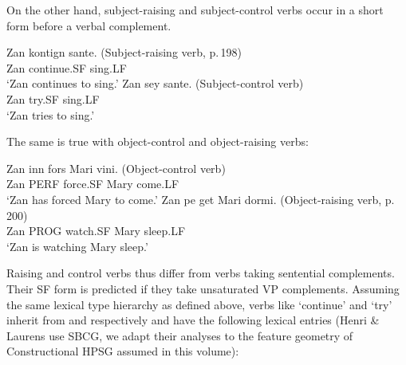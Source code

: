 \documentclass[output=paper]{langsci/langscibook}
\begin{document}
On the other hand, subject-raising and subject-control verbs occur in a short form before a verbal complement.

\begin{exe}
\ex \begin{xlist}
\ex \gll Zan kontign sante. (Subject-raising verb, p.\,198)\\
Zan continue.SF sing.LF\\
\glt `Zan continues to sing.'
\ex \gll Zan sey sante. (Subject-control verb)\\
Zan try.SF sing.LF\\
\glt `Zan tries to sing.'
\end{xlist}
\end{exe}

The same is true with object-control and object-raising verbs:
\begin{exe}
\ex \begin{xlist}
\ex \gll Zan inn fors Mari vini. (Object-control verb)\\
Zan PERF force.SF Mary come.LF\\
\glt `Zan has forced Mary to come.'
\ex \gll Zan pe get Mari dormi. (Object-raising verb, p.\,200) \\
Zan PROG watch.SF Mary sleep.LF\\
\glt `Zan is watching Mary sleep.'
\end{xlist}
\end{exe}


Raising  and control verbs thus differ from verbs taking sentential complements. Their SF form is
predicted if they take unsaturated VP complements. Assuming the same lexical type hierarchy as
defined above, verbs like  `continue' and  `try' inherit from
 and  respectively and have the following lexical entries (Henri
\& Laurens use SBCG, we adapt their analyses to the feature geometry of Constructional HPSG
\citep{Sag97a} assumed in this volume):
\end{document}

